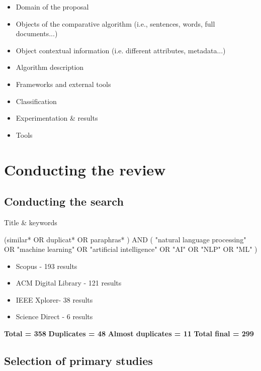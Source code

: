 \begin{itemize}
\item Domain of the proposal
\item Objects of the comparative algorithm (i.e., sentences, words, full documents...)
\item Object contextual information (i.e. different attributes, metadata...)
\item Algorithm description
\item Frameworks and external tools
\item Classification
\item Experimentation & results
\item Tools
\end{itemize}


\section{Conducting the review}

\subsection{Conducting the search}

Title \& keywords

(similar*  OR  duplicat*  OR  paraphras* )  AND  ( "natural language processing"  OR  "machine learning"  OR  "artificial intelligence"  OR  "AI" OR  "NLP"  OR  "ML" )

\begin{itemize}
\item Scopus - 193 results
\item ACM Digital Library - 121 results
\item IEEE Xplorer- 38 results
\item Science Direct - 6 results
\end{itemize}

\textbf{Total = 358}
\textbf{Duplicates = 48}
\textbf{Almost duplicates = 11}
\textbf{Total final = 299}

\subsection{Selection of primary studies}

